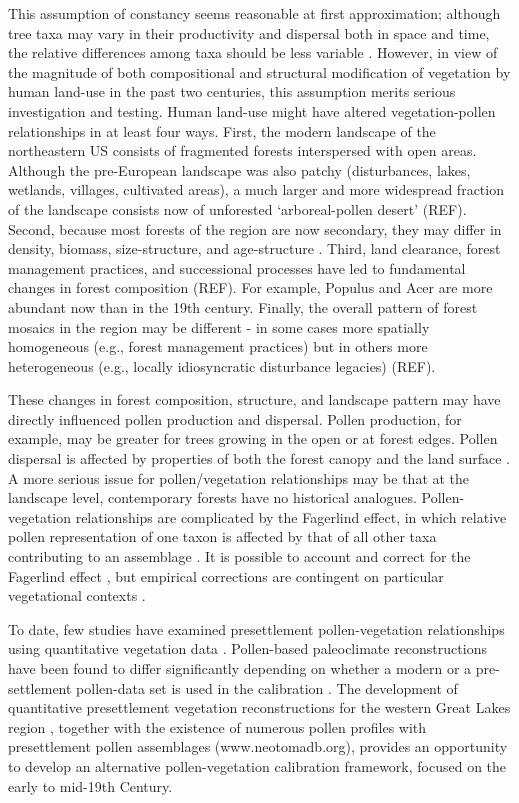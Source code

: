 \documentclass[12pt]{article}
\begin{document}
This assumption of constancy seems reasonable at first approximation;
although tree taxa may vary in their productivity and dispersal both
in space and time, the relative differences among taxa should be less
variable \citep{parsons1981statistical}.  However, in view of the
magnitude of both compositional and structural modification of
vegetation by human land-use in the past two centuries, this
assumption merits serious investigation and testing.  Human land-use
might have altered vegetation-pollen relationships in at least four
ways.  First, the modern landscape of the northeastern US consists of
fragmented forests interspersed with open areas.  Although the
pre-European landscape was also patchy (disturbances, lakes, wetlands,
villages, cultivated areas), a much larger and more widespread
fraction of the landscape consists now of unforested ‘arboreal-pollen
desert’ (REF).  Second, because most forests of the region are now
secondary, they may differ in density, biomass, size-structure, and
age-structure \citep{rhemtulla2009legacies}.  Third, land clearance,
forest management practices, and successional processes have led to
fundamental changes in forest composition (REF).  For example, Populus
and Acer are more abundant now than in the 19th century.  Finally, the
overall pattern of forest mosaics in the region may be different - in
some cases more spatially homogeneous (e.g., forest management
practices) but in others more heterogeneous (e.g., locally
idiosyncratic disturbance legacies) (REF).

These changes in forest composition, structure, and landscape pattern
may have directly influenced pollen production and dispersal.  Pollen
production, for example, may be greater for trees growing in the open
or at forest edges.  Pollen dispersal is affected by properties of
both the forest canopy and the land surface \citep{jackson1999pollen}.
A more serious issue for pollen/vegetation relationships may be that
at the landscape level, contemporary forests have no historical
analogues. Pollen-vegetation relationships are complicated by the
Fagerlind effect, in which relative pollen representation of one taxon
is affected by that of all other taxa contributing to an assemblage
\citep{prentice1988records}. It is possible to account and correct for
the Fagerlind effect \citep{prentice1986, jackson1995exploration}, but
empirical corrections are contingent on particular vegetational
contexts \citep{jackson1998quantitative}.

To date, few studies have examined presettlement pollen-vegetation
relationships using quantitative vegetation data
\citep{schwartz1989predicting}.  Pollen-based paleoclimate
reconstructions have been found to differ significantly depending on
whether a modern or a pre-settlement pollen-data set is used in the
calibration \citep{st2014bias}.  The development of quantitative
presettlement vegetation reconstructions for the western Great Lakes
region \citep{goring_witness}, together with the existence of numerous
pollen profiles with presettlement pollen assemblages
(www.neotomadb.org), provides an opportunity to develop an alternative
pollen-vegetation calibration framework, focused on the early to
mid-19th Century.  
\end{document}
